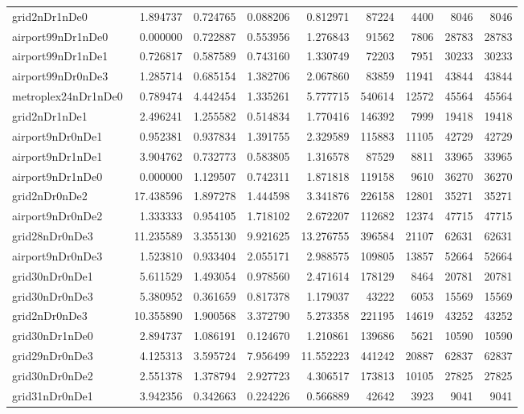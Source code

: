 \begin{longtable}{|l|r|r|r|r|r|r|r|r|}
grid2nDr1nDe0 & 1.894737 & 0.724765 & 0.088206 & 0.812971 & 87224 & 4400 & 8046 & 8046 \\
airport99nDr1nDe0 & 0.000000 & 0.722887 & 0.553956 & 1.276843 & 91562 & 7806 & 28783 & 28783 \\
airport99nDr1nDe1 & 0.726817 & 0.587589 & 0.743160 & 1.330749 & 72203 & 7951 & 30233 & 30233 \\
airport99nDr0nDe3 & 1.285714 & 0.685154 & 1.382706 & 2.067860 & 83859 & 11941 & 43844 & 43844 \\
metroplex24nDr1nDe0 & 0.789474 & 4.442454 & 1.335261 & 5.777715 & 540614 & 12572 & 45564 & 45564 \\
grid2nDr1nDe1 & 2.496241 & 1.255582 & 0.514834 & 1.770416 & 146392 & 7999 & 19418 & 19418 \\
airport9nDr0nDe1 & 0.952381 & 0.937834 & 1.391755 & 2.329589 & 115883 & 11105 & 42729 & 42729 \\
airport9nDr1nDe1 & 3.904762 & 0.732773 & 0.583805 & 1.316578 & 87529 & 8811 & 33965 & 33965 \\
airport9nDr1nDe0 & 0.000000 & 1.129507 & 0.742311 & 1.871818 & 119158 & 9610 & 36270 & 36270 \\
grid2nDr0nDe2 & 17.438596 & 1.897278 & 1.444598 & 3.341876 & 226158 & 12801 & 35271 & 35271 \\
airport9nDr0nDe2 & 1.333333 & 0.954105 & 1.718102 & 2.672207 & 112682 & 12374 & 47715 & 47715 \\
grid28nDr0nDe3 & 11.235589 & 3.355130 & 9.921625 & 13.276755 & 396584 & 21107 & 62631 & 62631 \\
airport9nDr0nDe3 & 1.523810 & 0.933404 & 2.055171 & 2.988575 & 109805 & 13857 & 52664 & 52664 \\
grid30nDr0nDe1 & 5.611529 & 1.493054 & 0.978560 & 2.471614 & 178129 & 8464 & 20781 & 20781 \\
grid30nDr0nDe3 & 5.380952 & 0.361659 & 0.817378 & 1.179037 & 43222 & 6053 & 15569 & 15569 \\
grid2nDr0nDe3 & 10.355890 & 1.900568 & 3.372790 & 5.273358 & 221195 & 14619 & 43252 & 43252 \\
grid30nDr1nDe0 & 2.894737 & 1.086191 & 0.124670 & 1.210861 & 139686 & 5621 & 10590 & 10590 \\
grid29nDr0nDe3 & 4.125313 & 3.595724 & 7.956499 & 11.552223 & 441242 & 20887 & 62837 & 62837 \\
grid30nDr0nDe2 & 2.551378 & 1.378794 & 2.927723 & 4.306517 & 173813 & 10105 & 27825 & 27825 \\
grid31nDr0nDe1 & 3.942356 & 0.342663 & 0.224226 & 0.566889 & 42642 & 3923 & 9041 & 9041 \\

\end{longtable}

